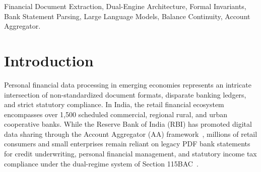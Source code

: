 \documentclass[conference]{IEEEtran}
\begin{document}
\begin{abstract}
We evaluate FinFlow across an empirical evaluation corpus ($\mathcal{E}_1$) of $N = 120$ multi-page PDF statements spanning eight major Indian banking institutions (5,290 transactions). The deterministic parsing tier achieves \textbf{100.00\% bank layout identification accuracy} and \textbf{100.00\% precision and recall} on single-amount suffix layouts (SBI, Kotak Mahindra, Bank of Baroda), while achieving an aggregate micro $F_1$ of \textbf{93.80\%}. Across 360 controlled corruption trials, the balance continuity invariant demonstrates \textbf{99.44\% fault recall} (99.17\% on transaction omissions, 100.00\% on phantom insertions, and 99.17\% on amount tampering), with \textbf{99.44\% exact row localization accuracy}. Compared to pure LLM extraction, the dual-engine architecture reduces cloud API invocations by over \textbf{66.7\%} and cuts mean parsing latency from \textbf{1,820 ms} to \textbf{4.2 ms} for standard layouts while guaranteeing complete ledger integrity.
\end{abstract}

\begin{IEEEkeywords}
Financial Document Extraction, Dual-Engine Architecture, Formal Invariants, Bank Statement Parsing, Large Language Models, Balance Continuity, Account Aggregator.
\end{IEEEkeywords}

\section{Introduction}
Personal financial data processing in emerging economies represents an intricate intersection of non-standardized document formats, disparate banking ledgers, and strict statutory compliance. In India, the retail financial ecosystem encompasses over 1,500 scheduled commercial, regional rural, and urban cooperative banks. While the Reserve Bank of India (RBI) has promoted digital data sharing through the Account Aggregator (AA) framework~\cite{rbi2021accountaggregator}, millions of retail consumers and small enterprises remain reliant on legacy PDF bank statements for credit underwriting, personal financial management, and statutory income tax compliance under the dual-regime system of Section 115BAC~\cite{cbdt2024financeact, incometaxact1961}.
\end{document}
